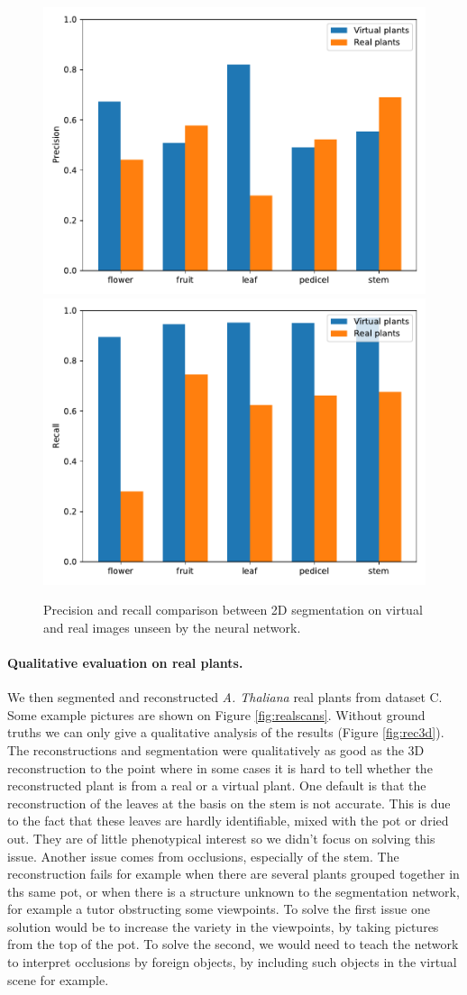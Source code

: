 \begin{figure}[h!]
    \centering \includegraphics[width =
0.5\linewidth]{figures/eval_precision_real.pdf}\includegraphics[width =
0.5\linewidth]{figures/eval_recall_real.pdf}
    \caption{Precision and recall comparison between 2D segmentation on
virtual and real images unseen by the neural network.} \label{fig:prec_recall_virt_real}
\end{figure}

\paragraph{Qualitative evaluation on real plants.}
We then segmented and reconstructed  \emph{A. Thaliana} real plants from dataset C. Some example pictures are shown on Figure \ref{fig:realscans}. Without ground truths we can only give a qualitative analysis of the results (Figure \ref{fig:rec3d}). The reconstructions and segmentation were qualitatively as good as the 3D reconstruction to the point where in some cases it is hard to tell whether the reconstructed plant is from a real or a virtual plant. One default is that the reconstruction of the leaves at the basis on the stem is not accurate. This is due to the fact that these leaves are hardly identifiable, mixed with the pot or dried out. They are of little phenotypical interest so we didn't focus on solving this issue. Another issue comes from occlusions, especially of the stem. The reconstruction fails for example when there are several plants grouped together in ths same pot, or when there is a structure unknown to the segmentation network, for example a tutor obstructing some viewpoints. To solve the first issue one solution would be to increase the variety in the viewpoints, by taking pictures from the top of the pot. To solve the second, we would need to teach the network to interpret occlusions by foreign objects, by including such objects in the virtual scene for example.

